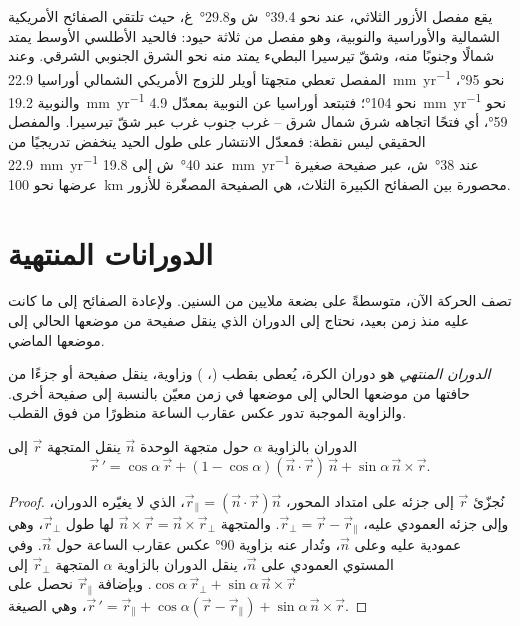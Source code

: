 يقع مفصل الأزور الثلاثي، عند نحو \ang{39.4}~ش و\ang{29.8}~غ، حيث تلتقي الصفائح الأمريكية الشمالية والأوراسية والنوبية، وهو مفصل من ثلاثة حيود: فالحيد الأطلسي الأوسط يمتد شمالًا وجنوبًا منه، وشقّ تيرسيرا البطيء يمتد منه نحو الشرق الجنوبي الشرقي. وعند المفصل تعطي متجهتا أويلر للزوج الأمريكي الشمالي أوراسيا \qty{22.9}{mm.yr^{-1}} نحو \ang{95}، والنوبية \qty{19.2}{mm.yr^{-1}} نحو \ang{104}؛ فتبتعد أوراسيا عن النوبية بمعدّل \qty{4.9}{mm.yr^{-1}} نحو \ang{59}، أي فتحًا اتجاهه شرق شمال شرق – غرب جنوب غرب عبر شقّ تيرسيرا. والمفصل الحقيقي ليس نقطة: فمعدّل الانتشار على طول الحيد ينخفض تدريجيًا من \qty{22.9}{mm.yr^{-1}} عند \ang{40}~ش إلى \qty{19.8}{mm.yr^{-1}} عند \ang{38}~ش، عبر صفيحة صغيرة عرضها نحو \qty{100}{km} محصورة بين الصفائح الكبيرة الثلاث، هي الصفيحة المصغّرة للأزور.

\section{الدورانات المنتهية}

تصف  الحركة الآن، متوسطةً على بضعة ملايين من السنين. ولإعادة الصفائح إلى ما كانت عليه منذ زمن بعيد، نحتاج إلى الدوران الذي ينقل صفيحة من موضعها الحالي إلى موضعها الماضي.

\begin{definition}\label{def:b1:plate-kinematics:finite-rotation}
\emph{الدوران المنتهي} هو دوران الكرة، يُعطى بقطب (، ) وزاوية، ينقل صفيحة أو جزءًا من حافتها من موضعها الحالي إلى موضعها في زمن معيّن بالنسبة إلى صفيحة أخرى. والزاوية الموجبة تدور عكس عقارب الساعة منظورًا من فوق القطب.
\end{definition}

\begin{proposition}\label{prop:b1:plate-kinematics:rodrigues}
الدوران بالزاوية $\alpha$ حول متجهة الوحدة $\vec n$ ينقل المتجهة $\vec r$ إلى
\[
  \vec r\,' = \cos\alpha\,\vec r + (1 - \cos\alpha)(\vec n\cdot\vec r)\,\vec n
  + \sin\alpha\,\vec n\times\vec r .
\]
\end{proposition}

\begin{proof}
نُجزّئ $\vec r$ إلى جزئه على امتداد المحور، $\vec r_\parallel =
(\vec n\cdot\vec r)\vec n$، الذي لا يغيّره الدوران، وإلى جزئه العمودي عليه، $\vec r_\perp = \vec r - \vec r_\parallel$. والمتجهة
$\vec n\times\vec r = \vec n\times\vec r_\perp$ لها طول $\vec r_\perp$، وهي عمودية عليه وعلى $\vec n$، وتُدار عنه بزاوية \ang{90} عكس عقارب الساعة حول $\vec n$. وفي المستوي العمودي على $\vec n$، ينقل الدوران بالزاوية $\alpha$ المتجهة $\vec r_\perp$ إلى $\cos\alpha\,\vec r_\perp +
\sin\alpha\,\vec n\times\vec r$. وبإضافة $\vec r_\parallel$ نحصل على $\vec r\,' =
\vec r_\parallel + \cos\alpha(\vec r - \vec r_\parallel) + \sin\alpha\,
\vec n\times\vec r$، وهي الصيغة.
\end{proof}

